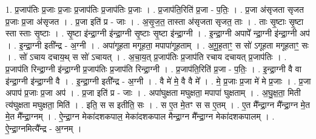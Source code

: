 \documentclass[17pt]{extarticle}
\begin{document}
1. प्र॒जाप॑तिः प्र॒जाः प्र॒जाः प्र॒जाप॑तिः प्र॒जाप॑तिः प्र॒जाः । . प्र॒जाप॑ति॒रिति॑ प्र॒जा - प॒तिः॒ । . प्र॒जा अ॑सृजता सृजत प्र॒जाः प्र॒जा अ॑सृजत । . प्र॒जा इति॑ प्र - जाः । . अ॒सृ॒ज॒त॒ तास्ता अ॑सृजता सृजत॒ ताः । . ताः सृ॒ष्टाः सृ॒ष्टा स्ता स्ताः सृ॒ष्टाः । . सृ॒ष्टा इ॑न्द्रा॒ग्नी इ॑न्द्रा॒ग्नी सृ॒ष्टाः सृ॒ष्टा इ॑न्द्रा॒ग्नी । . इ॒न्द्रा॒ग्नी अपापे᳚ न्द्रा॒ग्नी इ॑न्द्रा॒ग्नी अप॑ । . इ॒न्द्रा॒ग्नी इती᳚न्द्र - अ॒ग्नी । . अपा॑गूहता मगूहता॒ मपापा॑गूहताम् । . अ॒गू॒ह॒ताꣳ॒॒ स सो॑ ऽगूहता मगूहताꣳ॒॒ सः । . सो॑ ऽचाय दचाय॒थ् स सो॑ ऽचायत् । . अ॒चा॒य॒त् प्र॒जाप॑तिः प्र॒जाप॑ति रचाय दचायत् प्र॒जाप॑तिः । . प्र॒जाप॑ति रिन्द्रा॒ग्नी इ॑न्द्रा॒ग्नी प्र॒जाप॑तिः प्र॒जाप॑ति रिन्द्रा॒ग्नी । . प्र॒जाप॑ति॒रिति॑ प्र॒जा - प॒तिः॒ । . इ॒न्द्रा॒ग्नी वै वा इ॑न्द्रा॒ग्नी इ॑न्द्रा॒ग्नी वै । . इ॒न्द्रा॒ग्नी इती᳚न्द्र - अ॒ग्नी । . वै मे॑ मे॒ वै वै मे᳚ । . मे॒ प्र॒जाः प्र॒जा मे॑ मे प्र॒जाः । . प्र॒जा अपाप॑ प्र॒जाः प्र॒जा अप॑ । . प्र॒जा इति॑ प्र - जाः । . अपा॑घुक्षता मघुक्षता॒ मपापा॑ घुक्षताम् । . अ॒घु॒क्ष॒ता॒ मिती त्य॑घुक्षता मघुक्षता॒ मिति॑ । . इति॒ स स इतीति॒ सः । . स ए॒त मे॒तꣳ स स ए॒तम् । . ए॒त मै᳚न्द्रा॒ग्न मै᳚न्द्रा॒ग्न मे॒त मे॒त मै᳚न्द्रा॒ग्नम् । . ऐ॒न्द्रा॒ग्न मेका॑दशकपाल॒ मेका॑दशकपाल मैन्द्रा॒ग्न मै᳚न्द्रा॒ग्न मेका॑दशकपालम् । . ऐ॒न्द्रा॒ग्नमित्यै᳚न्द्र - अ॒ग्नम् । \newline
\end{document}
